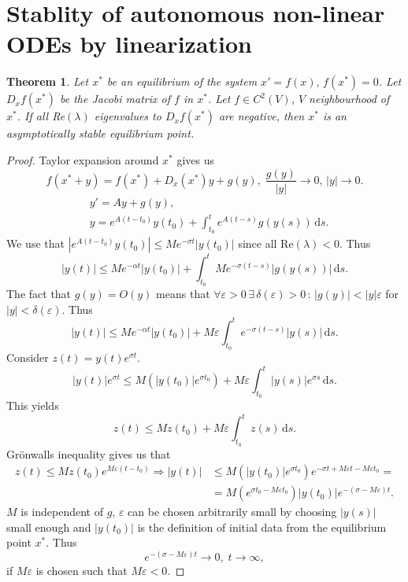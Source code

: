 \documentclass[12pt, a4paper]{article}
\newcommand{\rd}{\ensuremath{\mathrm{d}}}
\newcommand{\id}{\ensuremath{\,\rd}}
\newtheorem{theorem}{Theorem}[section]
\begin{document}
\section{Stablity of autonomous non-linear ODEs by linearization}
\begin{theorem}
Let $x^*$ be an equilibrium of the system $x' = f(x),\, f(x^*)=0$. Let $D_x f(x^*)$ be the Jacobi matrix of $f$ in $x^*$. Let $f\in C^2(V)$, $V$ neighbourhood of $x^*$. If all Re$(\lambda)$ eigenvalues to $D_x f(x^*)$ are negative, then $x^*$ is an asymptotically stable equilibrium point.
\end{theorem}
\begin{proof}
Taylor expansion around $x^*$ gives us
\begin{equation*}
f(x^* + y) = f(x^*) + D_x(x^*)y + g(y),\; \frac{g(y)}{|y|} \to 0,\, |y|\to 0.
\end{equation*}
\begin{equation*}
\begin{split}
&y' = Ay + g(y), \\
&y = e^{A(t-t_0)}y(t_0) + \int_{t_0}^t e^{A(t-s)}g(y(s))\id s.
\end{split}
\end{equation*}
We use that $|e^{A(t-t_0)}y(t_0)|\leq Me^{-\sigma t}|y(t_0)|$ since all Re$(\lambda)<0$. Thus
\begin{equation*}
|y(t)| \leq Me^{-\alpha t}|y(t_0)| + \int_{t_0}^t Me^{-\sigma(t-s)}|g(y(s))|\id s.
\end{equation*}
The fact that $g(y)=O(y)$ means that $\forall \varepsilon>0\, \exists\, \delta(\varepsilon)>0\, :\, |g(y)|<|y|\varepsilon$ for $|y|<\delta(\varepsilon)$. Thus
\begin{equation*}
|y(t)|\leq Me^{-\alpha t}|y(t_0)| + M\varepsilon\int_{t_0}^t e^{-\sigma(t-s)}|y(s)|\id s.
\end{equation*}
Consider $z(t)=y(t)e^{\sigma t}$.
\begin{equation*}
|y(t)|e^{\sigma t} \leq M(|y(t_0)|e^{\sigma t_0}) + M\varepsilon\int_{t_0}^t |y(s)|e^{\sigma s}\id s.
\end{equation*}
This yields
\begin{equation*}
z(t) \leq Mz(t_0) + M\varepsilon\int_{t_0}^t z(s)\id s.
\end{equation*}
Grönwalls inequality gives us that
\begin{equation*}
\begin{split}
z(t)\leq Mz(t_0)e^{M\varepsilon(t-t_0)} \Rightarrow |y(t)|&\leq M(|y(t_0)|e^{\sigma t_0})e^{-\sigma t + M\varepsilon t - M\varepsilon t_0} = \\
& = M(e^{\sigma t_0 - M\varepsilon t_0})|y(t_0)|e^{-(\sigma-M\varepsilon)t}.
\end{split}
\end{equation*}
$M$ is independent of $g$, $\varepsilon$ can be chosen arbitrarily small by choosing $|y(s)|$ small enough and $|y(t_0)|$ is the definition of initial data from the equilibrium point $x^*$. Thus
\begin{equation*}
e^{-(\sigma-M\varepsilon)t}\to 0,\; t\to\infty,
\end{equation*}
if $M\varepsilon$ is chosen such that $M\varepsilon<0$.
\end{proof}
\end{document}
